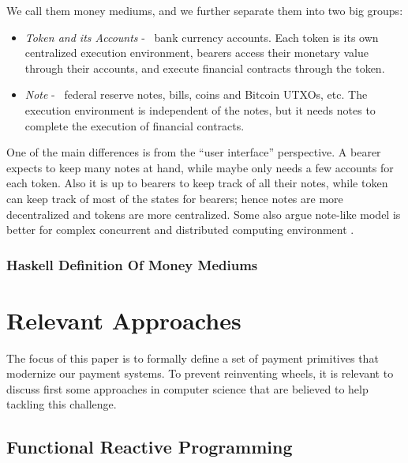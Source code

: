 We call them money mediums, and we further separate them into two big groups:

\begin{itemize}
    \item \textit{Token and its Accounts} - \eg\ bank currency accounts. Each token is its own
centralized execution environment, bearers access their monetary value through their accounts, and
execute financial contracts through the token.

    \item \textit{Note} - \eg\ federal reserve notes, bills, coins and Bitcoin UTXOs, etc. The
execution environment is independent of the notes, but it needs notes to complete the execution of
financial contracts.
\end{itemize}

One of the main differences is from the ``user interface'' perspective. A bearer expects to keep
many notes at hand, while maybe only needs a few accounts for each token. Also it is up to bearers
to keep track of all their notes, while token can keep track of most of the states for bearers;
hence notes are more decentralized and tokens are more centralized. Some also argue note-like model
is better for complex concurrent and distributed computing environment
.

\subsubsection{Haskell Definition Of Money Mediums}



\section{Relevant Approaches}

The focus of this paper is to formally define a set of payment primitives that modernize our payment
systems. To prevent reinventing wheels, it is relevant to discuss first some approaches in computer
science that are believed to help tackling this challenge.

\subsection{Functional Reactive Programming}

